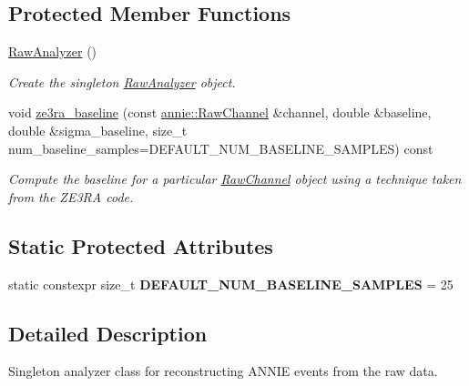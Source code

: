 \subsection*{Protected Member Functions}
\begin{DoxyCompactItemize}
\item 
\hypertarget{classannie_1_1RawAnalyzer_abf612bfdacdea2908e138016e2eb0080}{\hyperlink{classannie_1_1RawAnalyzer_abf612bfdacdea2908e138016e2eb0080}{Raw\-Analyzer} ()}\label{classannie_1_1RawAnalyzer_abf612bfdacdea2908e138016e2eb0080}

\begin{DoxyCompactList}\small\item\em Create the singleton \hyperlink{classannie_1_1RawAnalyzer}{Raw\-Analyzer} object. \end{DoxyCompactList}\item 
void \hyperlink{classannie_1_1RawAnalyzer_a33d2f06b95aa38e099d735809a80c085}{ze3ra\-\_\-baseline} (const \hyperlink{classannie_1_1RawChannel}{annie\-::\-Raw\-Channel} \&channel, double \&baseline, double \&sigma\-\_\-baseline, size\-\_\-t num\-\_\-baseline\-\_\-samples=D\-E\-F\-A\-U\-L\-T\-\_\-\-N\-U\-M\-\_\-\-B\-A\-S\-E\-L\-I\-N\-E\-\_\-\-S\-A\-M\-P\-L\-E\-S) const 
\begin{DoxyCompactList}\small\item\em Compute the baseline for a particular \hyperlink{classannie_1_1RawChannel}{Raw\-Channel} object using a technique taken from the Z\-E3\-R\-A code. \end{DoxyCompactList}\end{DoxyCompactItemize}
\subsection*{Static Protected Attributes}
\begin{DoxyCompactItemize}
\item 
\hypertarget{classannie_1_1RawAnalyzer_af2922e3755357bc385d3bb0698927da8}{static constexpr size\-\_\-t {\bfseries D\-E\-F\-A\-U\-L\-T\-\_\-\-N\-U\-M\-\_\-\-B\-A\-S\-E\-L\-I\-N\-E\-\_\-\-S\-A\-M\-P\-L\-E\-S} = 25}\label{classannie_1_1RawAnalyzer_af2922e3755357bc385d3bb0698927da8}

\end{DoxyCompactItemize}


\subsection{Detailed Description}
Singleton analyzer class for reconstructing A\-N\-N\-I\-E events from the raw data. 

